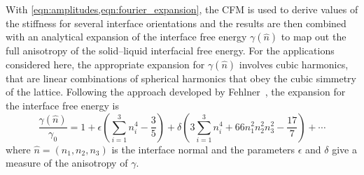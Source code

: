 
With \cref{eqn:amplitudes,eqn:fourier_expansion}, the CFM is used to derive values of the stiffness for several interface orientations and the results are then combined with an analytical expansion of the interface free energy $\gamma(\hat{n})$ to map out the full anisotropy of the solid--liquid interfacial free energy. For the applications considered here, the appropriate expansion for $\gamma(\hat{n})$ involves cubic harmonics, that are linear combinations of spherical harmonics that obey the cubic simmetry of the lattice. Following the approach developed by Fehlner~\cite{Fehlner1976}, the expansion for the interface free energy is
\begin{equation}
\label{eqn:cubic_harmonics}
    \frac{\gamma(\hat{n})}{\gamma_0} = 1 + \epsilon \left( \sum_{i=1}^3 n_i^4-\frac{3}{5}\right) + \delta \left( 3 \sum_{i=1}^3 n_i^{4}+ 66 n_1^2 n_2^2 n_3^2- \frac{17}{7}\right)+\cdots
\end{equation}
where $\hat{n}=(n_1,n_2,n_3)$ is the interface normal and the parameters $\epsilon$ and $\delta$ give a measure of the anisotropy of $\gamma$.

